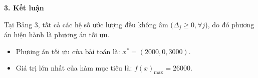 \textbf{3. Kết luận}

Tại Bảng 3, tất cả các hệ số ước lượng đều không âm ($\Delta_j \ge 0, \forall j$), do đó phương án hiện hành là phương án tối ưu.
\begin{itemize}
    \item Phương án tối ưu của bài toán là: $x^* = (2000, 0, 3000)$.
    \item Giá trị lớn nhất của hàm mục tiêu là: $f(x)_{\max} = 26000$.
\end{itemize}